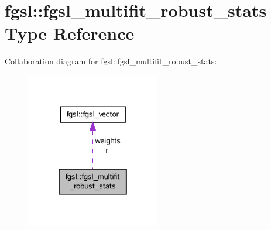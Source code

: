 \hypertarget{structfgsl_1_1fgsl__multifit__robust__stats}{\section{fgsl\-:\-:fgsl\-\_\-multifit\-\_\-robust\-\_\-stats Type Reference}
\label{structfgsl_1_1fgsl__multifit__robust__stats}
}


Collaboration diagram for fgsl\-:\-:fgsl\-\_\-multifit\-\_\-robust\-\_\-stats\-:
\nopagebreak
\begin{figure}[H]
\begin{center}
\leavevmode
\includegraphics[width=166pt]{structfgsl_1_1fgsl__multifit__robust__stats__coll__graph}
\end{center}
\end{figure}
